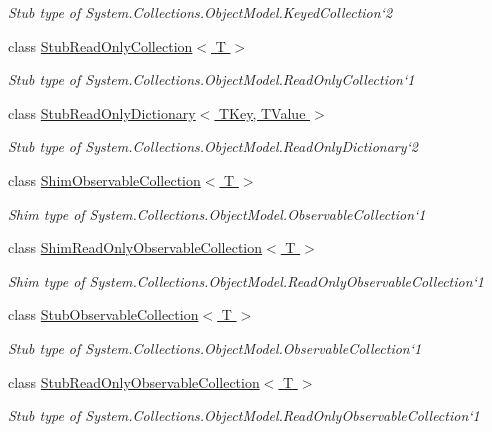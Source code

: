 \begin{DoxyCompactItemize}
\begin{DoxyCompactList}\small\item\em Stub type of System.\-Collections.\-Object\-Model.\-Keyed\-Collection`2\end{DoxyCompactList}\item 
class \hyperlink{class_system_1_1_collections_1_1_object_model_1_1_fakes_1_1_stub_read_only_collection_3_01_t_01_4}{Stub\-Read\-Only\-Collection$<$ T $>$}
\begin{DoxyCompactList}\small\item\em Stub type of System.\-Collections.\-Object\-Model.\-Read\-Only\-Collection`1\end{DoxyCompactList}\item 
class \hyperlink{class_system_1_1_collections_1_1_object_model_1_1_fakes_1_1_stub_read_only_dictionary_3_01_t_key_00_01_t_value_01_4}{Stub\-Read\-Only\-Dictionary$<$ T\-Key, T\-Value $>$}
\begin{DoxyCompactList}\small\item\em Stub type of System.\-Collections.\-Object\-Model.\-Read\-Only\-Dictionary`2\end{DoxyCompactList}\item 
class \hyperlink{class_system_1_1_collections_1_1_object_model_1_1_fakes_1_1_shim_observable_collection_3_01_t_01_4}{Shim\-Observable\-Collection$<$ T $>$}
\begin{DoxyCompactList}\small\item\em Shim type of System.\-Collections.\-Object\-Model.\-Observable\-Collection`1\end{DoxyCompactList}\item 
class \hyperlink{class_system_1_1_collections_1_1_object_model_1_1_fakes_1_1_shim_read_only_observable_collection_3_01_t_01_4}{Shim\-Read\-Only\-Observable\-Collection$<$ T $>$}
\begin{DoxyCompactList}\small\item\em Shim type of System.\-Collections.\-Object\-Model.\-Read\-Only\-Observable\-Collection`1\end{DoxyCompactList}\item 
class \hyperlink{class_system_1_1_collections_1_1_object_model_1_1_fakes_1_1_stub_observable_collection_3_01_t_01_4}{Stub\-Observable\-Collection$<$ T $>$}
\begin{DoxyCompactList}\small\item\em Stub type of System.\-Collections.\-Object\-Model.\-Observable\-Collection`1\end{DoxyCompactList}\item 
class \hyperlink{class_system_1_1_collections_1_1_object_model_1_1_fakes_1_1_stub_read_only_observable_collection_3_01_t_01_4}{Stub\-Read\-Only\-Observable\-Collection$<$ T $>$}
\begin{DoxyCompactList}\small\item\em Stub type of System.\-Collections.\-Object\-Model.\-Read\-Only\-Observable\-Collection`1\end{DoxyCompactList}\end{DoxyCompactItemize}
